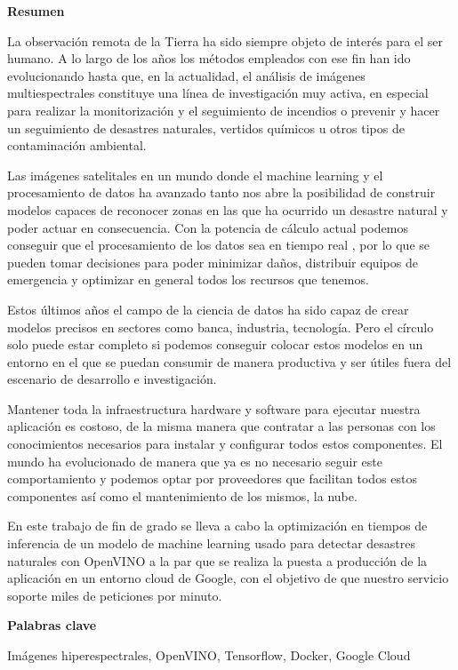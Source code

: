 \cleardoublepage
\begin{center}

{\bf \Huge Resumen}

\end{center}

La observación remota de la Tierra ha sido siempre objeto de interés para el ser humano.
A lo largo de los años los métodos empleados con ese fin han ido evolucionando hasta que, en la actualidad, el análisis de imágenes multiespectrales constituye una línea de
investigación muy activa, en especial para realizar la monitorización y el seguimiento de incendios o prevenir y hacer un seguimiento de desastres naturales, vertidos químicos
u otros tipos de contaminación ambiental.

Las imágenes satelitales en un mundo donde el machine learning y el procesamiento de datos ha avanzado tanto nos abre la posibilidad de construir modelos capaces de reconocer zonas
en las que ha ocurrido un desastre natural y poder actuar en consecuencia.
Con la potencia de cálculo actual podemos conseguir que el procesamiento de los datos sea en tiempo real , por lo que se pueden tomar decisiones para poder minimizar daños, distribuir
equipos de emergencia y optimizar en general todos los recursos que tenemos.

Estos últimos años el campo de la ciencia de datos ha sido capaz de crear modelos precisos en sectores como banca, industria, tecnología.
Pero el círculo solo puede estar completo si podemos
conseguir colocar estos modelos en un entorno en el que se puedan consumir de manera productiva y ser útiles fuera del escenario de desarrollo e investigación.

Mantener toda la infraestructura hardware y software para ejecutar nuestra aplicación es costoso, de la misma manera que contratar a las personas con los conocimientos necesarios
para instalar y configurar todos estos componentes.
El mundo ha evolucionado de manera que ya es no necesario seguir este comportamiento y podemos optar por proveedores que facilitan todos estos componentes
así como el mantenimiento de los mismos, la nube.

En este trabajo de fin de grado se lleva a cabo la optimización en tiempos de inferencia de un modelo de machine learning usado para detectar desastres naturales con OpenVINO a la par que se realiza la puesta a
producción de la aplicación en un entorno cloud de Google, con el objetivo de que nuestro servicio soporte miles de peticiones por minuto.

\vspace{0.8cm}
\begin{center}


{\bf \Large Palabras clave}

\end{center}

Imágenes hiperespectrales, OpenVINO, Tensorflow, Docker, Google Cloud

\vspace{0.3cm}